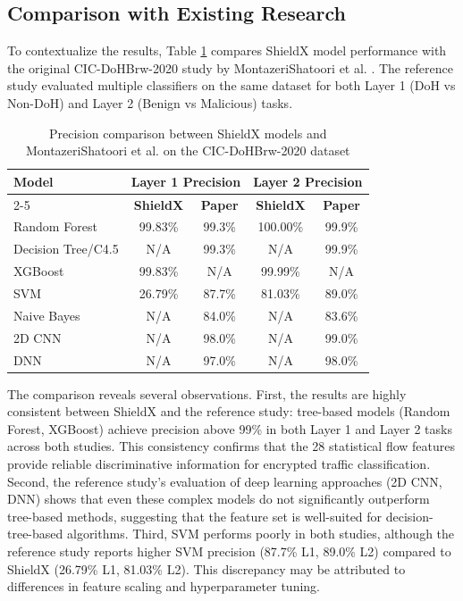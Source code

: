 \documentclass[../Main.tex]{subfiles}
\begin{document}
\subsection{Comparison with Existing Research}
\label{section:4.6.6a}

To contextualize the results, Table \ref{tab:comparison_paper} compares ShieldX model performance with the original CIC-DoHBrw-2020 study by MontazeriShatoori et al. \cite{montazeri2020doh}. The reference study evaluated multiple classifiers on the same dataset for both Layer 1 (DoH vs Non-DoH) and Layer 2 (Benign vs Malicious) tasks.

\begin{table}[H]
\centering
\small
\begin{tabular}{|l|c|c|c|c|}
\hline
\multirow{2}{*}{\textbf{Model}} & \multicolumn{2}{c|}{\textbf{Layer 1 Precision}} & \multicolumn{2}{c|}{\textbf{Layer 2 Precision}} \\
\cline{2-5}
 & \textbf{ShieldX} & \textbf{Paper \cite{montazeri2020doh}} & \textbf{ShieldX} & \textbf{Paper \cite{montazeri2020doh}} \\
\hline
Random Forest    & 99.83\% & 99.3\% & 100.00\% & 99.9\% \\
Decision Tree/C4.5 & N/A   & 99.3\% & N/A      & 99.9\% \\
XGBoost          & 99.83\% & N/A   & 99.99\%  & N/A   \\
SVM              & 26.79\% & 87.7\% & 81.03\%  & 89.0\% \\
Naive Bayes      & N/A     & 84.0\% & N/A      & 83.6\% \\
2D CNN           & N/A     & 98.0\% & N/A      & 99.0\% \\
DNN              & N/A     & 97.0\% & N/A      & 98.0\% \\
\hline
\end{tabular}
\caption{Precision comparison between ShieldX models and MontazeriShatoori et al. \cite{montazeri2020doh} on the CIC-DoHBrw-2020 dataset}
\label{tab:comparison_paper}
\end{table}

The comparison reveals several observations. First, the results are highly consistent between ShieldX and the reference study: tree-based models (Random Forest, XGBoost) achieve precision above 99\% in both Layer 1 and Layer 2 tasks across both studies. This consistency confirms that the 28 statistical flow features provide reliable discriminative information for encrypted traffic classification. Second, the reference study's evaluation of deep learning approaches (2D CNN, DNN) shows that even these complex models do not significantly outperform tree-based methods, suggesting that the feature set is well-suited for decision-tree-based algorithms. Third, SVM performs poorly in both studies, although the reference study reports higher SVM precision (87.7\% L1, 89.0\% L2) compared to ShieldX (26.79\% L1, 81.03\% L2). This discrepancy may be attributed to differences in feature scaling and hyperparameter tuning.
\end{document}

